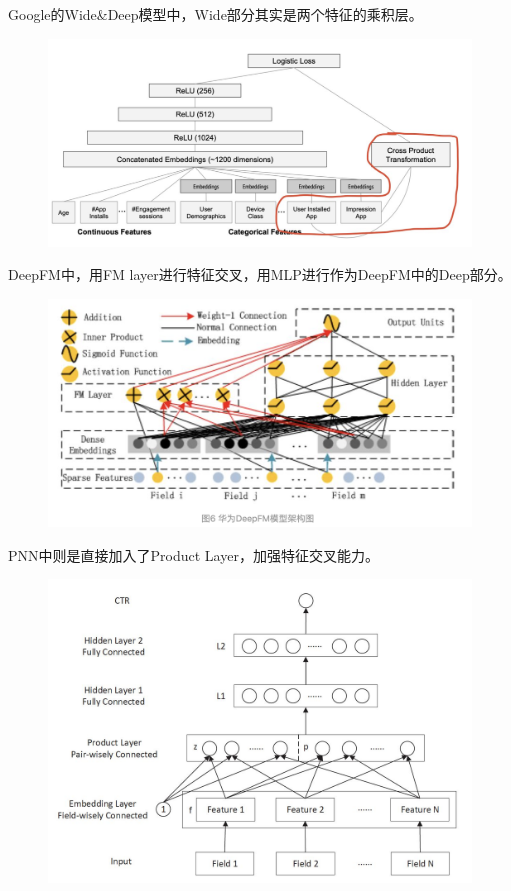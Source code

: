 \documentclass[12pt]{article}
\begin{document}
Google的Wide\&Deep模型中，Wide部分其实是两个特征的乘积层。
\begin{figure}[H]
    \centering
    \includegraphics[width=1\textwidth]{fig/Wide_Deep_Structure_Detail.png}
\end{figure}

DeepFM中，用FM layer进行特征交叉，用MLP进行作为DeepFM中的Deep部分。
\begin{figure}[H]
    \centering
    \includegraphics[width=1\textwidth]{fig/Huawei_DeepFM_Structure.png}
\end{figure}

PNN中则是直接加入了Product Layer，加强特征交叉能力。
\begin{figure}[H]
    \centering
    \includegraphics[width=1\textwidth]{fig/PNN_Structure.jpg}
\end{figure}
\end{document}
